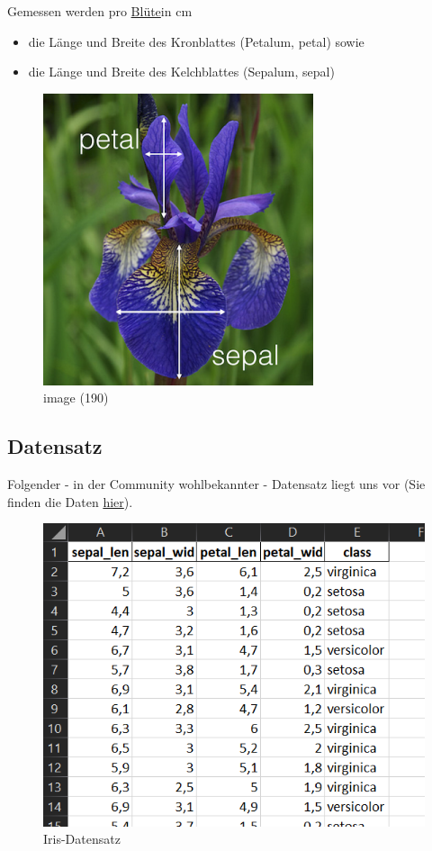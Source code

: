 \documentclass[
  oneside]{book}
\providecommand{\tightlist}{%
  \setlength{\itemsep}{0pt}\setlength{\parskip}{0pt}}
\begin{document}
Gemessen werden pro \href{https://de.wikipedia.org/wiki/Bl\%C3\%BCte}{Blüte}in cm 

\begin{itemize}
\tightlist
\item
  die Länge und Breite des Kronblattes (Petalum, petal) sowie 
\item
  die Länge und Breite des Kelchblattes (Sepalum, sepal)
\end{itemize}

\begin{figure}
\centering
\includegraphics{assets/daten.assets/image_messung-16426070933692.png}
\caption{image (190)}
\end{figure}

\hypertarget{datensatz}{%
\subsection{Datensatz}\label{datensatz}}

Folgender - in der Community wohlbekannter - Datensatz liegt uns vor (Sie finden die Daten \href{https://syncandshare.lrz.de/getlink/fi89kxTJ5yLRaW5mnpyrofVK/Iris_p.xlsx}{hier}).

\begin{figure}
\centering
\includegraphics{assets/daten.assets/image-20211209101425856-16426070878651.png}
\caption{Iris-Datensatz}
\end{figure}
\end{document}
